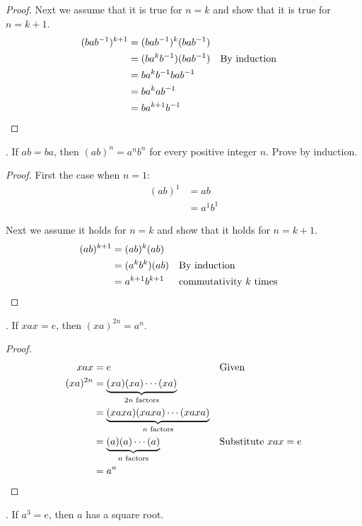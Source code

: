 \documentclass[twoside]{amsart}
\begin{document}
\begin{enumerate}[A.]
\begin{proof}
   Next we assume that it is true for $n=k$ and show that it is
   true for $n=k+1$.
      \begin{align*}
         (bab^{-1})^{k+1} & = (bab^{-1})^k(bab^{-1}) \\
	                  & = (ba^kb^{-1})(bab^{-1}) && \text{By induction}\\
			  & = ba^kb^{-1}bab^{-1} \\
			  & = ba^kab^{-1} \\
			  & = ba^{k+1}b^{-1} \qedhere
      \end{align*}
   \end{proof}

   . If $ab = ba$, then $(ab)^n = a^nb^n$ for every positive 
   integer $n$. Prove by induction.
   \begin{proof}
   First the case when $n=1$:
      \begin{align*}
         (ab)^1 & = ab \\
                & = a^1b^1
      \end{align*}

   Next we assume it holds for $n=k$ and show that it holds for
   $n=k+1$.
      \begin{align*}
         (ab)^{k+1} & = (ab)^k(ab) \\
	            & = (a^kb^k)(ab) && \text{By induction} \\
		    & = a^{k+1}b^{k+1} && \text{commutativity $k$ times}
		        \qedhere
      \end{align*}
   \end{proof}

   . If $xax=e$, then $(xa)^{2n} = a^n$.

   \begin{proof}
      \begin{align*}
         xax & = e        && \text{Given} \\
	 (xa)^{2n} & = \underbrace{(xa)(xa)\cdots (xa)}_{2n \text{ factors}}\\
	           & = 
		   \underbrace{(xaxa)(xaxa)\cdots(xaxa)}_{n \text{ factors}}\\
		   & = \underbrace{(a)(a)\cdots(a)}_{n \text{ factors}} 
		       && \text{Substitute $xax=e$} \\
		   & = a^n \qedhere
      \end{align*}
   \end{proof}

   . If $a^3=e$, then $a$ has a square root.


\end{enumerate}
\end{document}
